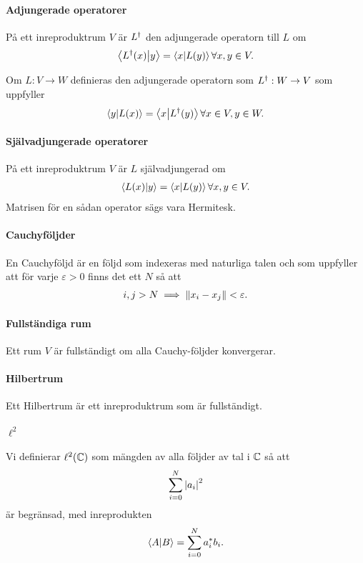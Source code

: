\paragraph{Adjungerade operatorer}
På ett inreproduktrum $V$ är $L^{\dagger}$ den adjungerade operatorn till $L$ om
\begin{align*}
	\bra{L^{\dagger}(x)}\ket{y} = \bra{x}\ket{L(y)}\forall x, y\in V.
\end{align*}

Om $L: V\to W$ definieras den adjungerade operatorn som $L^{\dagger}: W\to V$ som uppfyller
\begin{align*}
	\bra{y}\ket{L(x)} = \bra{x}\ket{L^{\dagger}(y)}\forall x \in V, y\in W.
\end{align*}

\paragraph{Självadjungerade operatorer}
På ett inreproduktrum $V$ är $L$ självadjungerad om
\begin{align*}
	\bra{L(x)}\ket{y} = \bra{x}\ket{L(y)}\forall x, y\in V.
\end{align*}
Matrisen för en sådan operator sägs vara Hermitesk.

\paragraph{Cauchyföljder}
En Cauchyföljd är en följd som indexeras med naturliga talen och som uppfyller att för varje $\varepsilon > 0$ finns det ett $N$ så att
\begin{align*}
	i, j > N\implies \norm{x_{i} - x_{j}} < \varepsilon.
\end{align*}

\paragraph{Fullständiga rum}
Ett rum $V$ är fullständigt om alla Cauchy-följder konvergerar.

\paragraph{Hilbertrum}
Ett Hilbertrum är ett inreproduktrum som är fullständigt.

\paragraph{$\ell^{2}$}
Vi definierar $\ell^{2}(\mathbb{C})$ som mängden av alla följder av tal i $\mathbb{C}$ så att
\begin{align*}
	\sum\limits_{i = 0}^{N}\abs{a_{i}}^{2}
\end{align*}
är begränsad, med inreprodukten
\begin{align*}
	\bra{A}\ket{B} = \sum\limits_{i = 0}^{N}a_{i}^{*}b_{i}.
\end{align*}


